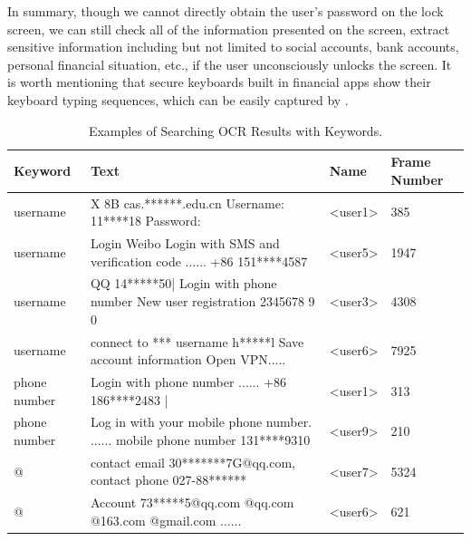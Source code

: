 In summary, though we cannot directly obtain the user's password on the lock screen, we can still check all of the information presented on the screen, extract sensitive information including but not limited to social accounts, bank accounts, personal financial situation, etc., if the user unconsciously unlocks the screen.
It is worth mentioning that {secure keyboards} built in financial apps show their keyboard typing sequences, which can be easily captured by \tool.



\begin{table}[t]
	\centering
	\begin{tabular}{|l|l|l|l|}
		\hline
		\textbf{Keyword} & \textbf{Text}                                                             & \textbf{Name}                                   & \textbf{Frame Number} \\ \hline
		username                          & X 8B cas.******.edu.cn Username: 11****18 Password:                                        & \textless{}user1\textgreater{} & 385                                    \\ \hline
		username                          & Login Weibo Login with SMS and verification code ...... +86 151****4587                    & \textless{}user5\textgreater{} & 1947                                   \\ \hline
		username                          & QQ 14*****50| Login with phone number New user registration 2345678 9 0                    & \textless{}user3\textgreater{} & 4308                                   \\ \hline
		username                          & connect to *** username h*****l Save account information Open VPN.....                     & \textless{}user6\textgreater{} & 7925                                   \\ \hline
		phone number                      & Login with phone number ...... +86 186****2483 |                                           & \textless{}user1\textgreater{} & 313                                    \\ \hline
		phone number                      & Log in with your mobile phone number. ...... mobile phone number 131****9310 & \textless{}user9\textgreater{} & 210                                    \\ \hline
		@                                 & contact email 30*******7G@qq.com, contact phone 027-88******                               & \textless{}user7\textgreater{} & 5324                                   \\ \hline
		@                                 & Account 73*****5@qq.com @qq.com @163.com @gmail.com 	......      & \textless{}user6\textgreater{} & 621                                    \\ \hline
	\end{tabular}
	\linebreak
	\caption{Examples of Searching \ac{OCR} Results with Keywords.}
	\label{tab:ocr_keyword_example}
\end{table}

